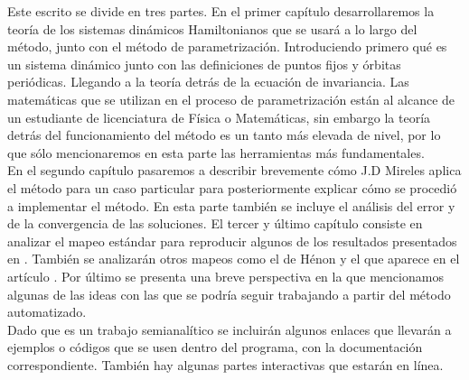 Este escrito se divide en tres partes. En el primer capítulo desarrollaremos la teoría de los sistemas dinámicos Hamiltonianos que se usará a lo largo del método, junto con el método de parametrización. Introduciendo primero qué es un sistema dinámico junto con las definiciones de puntos fijos y órbitas periódicas. Llegando a la teoría detrás de la ecuación de invariancia. Las matemáticas que se utilizan en el proceso de parametrización están al alcance de un estudiante de licenciatura de Física o Matemáticas, sin embargo la teoría detrás del funcionamiento del método es un tanto más elevada de nivel, por lo que sólo mencionaremos en esta parte las herramientas más fundamentales.  \\


En el segundo capítulo pasaremos a describir brevemente cómo J.D Mireles aplica el método para un caso particular para posteriormente explicar cómo se procedió a implementar el método. En esta parte también se incluye el análisis del error y de la convergencia de las soluciones. El tercer y último capítulo consiste en analizar el mapeo estándar para reproducir algunos de los resultados presentados en \cite{Mireles}. También se analizarán otros mapeos como el de Hénon y el que aparece en el artículo \cite{Jung}. Por último se presenta una breve perspectiva en la que mencionamos algunas de las ideas con las que se podría seguir trabajando a partir del método automatizado. \\

Dado que es un trabajo semianalítico se incluirán algunos enlaces que llevarán a ejemplos o códigos que se usen dentro del programa, con la documentación correspondiente. También hay algunas partes interactivas que estarán en línea. 

